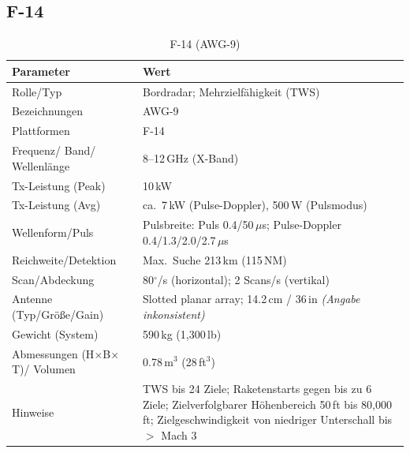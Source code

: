 \subsection{F-14 \parencite{Forecast1999_AWG9_APG71}}
\begin{table}[h]
\centering
\renewcommand{\arraystretch}{1.15}
\begin{tabular}{p{3.9cm} p{10.7cm}}
\hline
\textbf{Parameter} & \textbf{Wert} \\
\hline
Rolle/Typ & Bordradar; Mehrzielfähigkeit (TWS) \\
Bezeichnungen & AWG-9 \\
Plattformen & F-14 \\
Frequenz/ Band/ Wellenlänge & 8--12\,GHz (X-Band) \\
Tx-Leistung (Peak) & 10\,kW \\
Tx-Leistung (Avg) & ca.\ 7\,kW (Pulse-Doppler), 500\,W (Pulsmodus) \\
Wellenform/Puls & Pulsbreite: Puls 0.4/50\,\(\mu\)s; Pulse-Doppler 0.4/1.3/2.0/2.7\,\(\mu\)s \\
Reichweite/Detektion & Max.\ Suche 213\,km (115\,NM) \\
Scan/Abdeckung & 80\(^\circ\)/s (horizontal); 2 Scans/s (vertikal) \\
Antenne (Typ/Größe/Gain) & Slotted planar array; 14.2\,cm / 36\,in \emph{(Angabe inkonsistent)} \\
Gewicht (System) & 590\,kg (1{,}300\,lb) \\
Abmessungen (H\(\times\)B\(\times\)T)/ Volumen & 0.78\,m\(^3\) (28\,ft\(^3\)) \\
Hinweise & TWS bis 24 Ziele; Raketenstarts gegen bis zu 6 Ziele; Zielverfolgbarer Höhenbereich 50\,ft bis 80{,}000\,ft; Zielgeschwindigkeit von niedriger Unterschall bis \(>\) Mach 3 \\
\hline
\end{tabular}
\caption{F-14 (AWG-9)}
\end{table}

